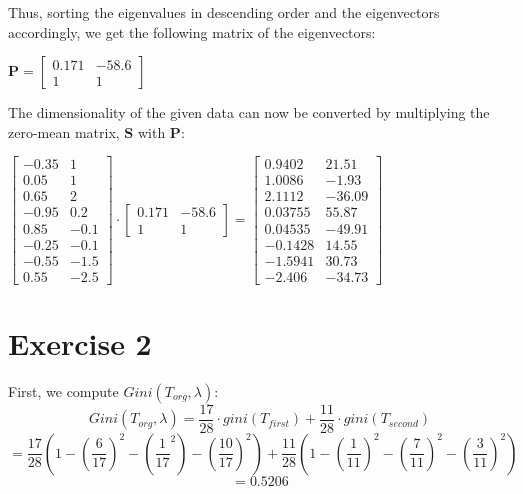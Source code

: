 \documentclass{report}
\begin{document}
Thus, sorting the eigenvalues in descending order and the eigenvectors accordingly, we get the following matrix of the eigenvectors:
\begin{center}
    \begin{math}
        \bm{P} =
        \left[
            \begin{array}{cc}
                0.171 & -58.6 \\
                1 & 1
            \end{array}
        \right]
    \end{math}
\end{center}
The dimensionality of the given data can now be converted by multiplying the zero-mean matrix, $\bm{S}$ with $\bm{P}$:
\begin{center}
    \begin{math}
        \begin{bmatrix}
            -0.35 & 1 \\
            0.05 & 1 \\
            0.65 & 2 \\
            -0.95 & 0.2 \\
            0.85 & -0.1 \\
            -0.25 & -0.1 \\
            -0.55 & -1.5 \\
            0.55 & -2.5
        \end{bmatrix}
        \cdot
        \left[
            \begin{array}{cc}
                0.171 & -58.6 \\
                1 & 1
            \end{array}
        \right]
        =
        \begin{bmatrix}
            0.9402 & 21.51 \\
            1.0086 & -1.93 \\
            2.1112 & -36.09 \\
            0.03755 & 55.87 \\
            0.04535 & -49.91 \\
            -0.1428 & 14.55 \\
            -1.5941 & 30.73 \\
            -2.406 & -34.73
        \end{bmatrix}
    \end{math}
\end{center}

\section*{Exercise 2}
First, we compute $Gini(T_{org}, \lambda)$:
$$Gini(T_{org}, \lambda) = \frac{17}{28} \cdot gini(T_{first}) + \frac{11}{28} \cdot gini(T_{second})$$
$$= \frac{17}{28} \left(1 - \left(\frac{6}{17}\right)^2 - \left( \frac{1}{17}^2 \right) - \left( \frac{10}{17} \right)^2 \right) + \frac{11}{28} \left(1 - \left( \frac{1}{11} \right)^2 - \left( \frac{7}{11} \right)^2 - \left( \frac{3}{11} \right)^2 \right)$$
$$ = 0.5206$$
\end{document}
